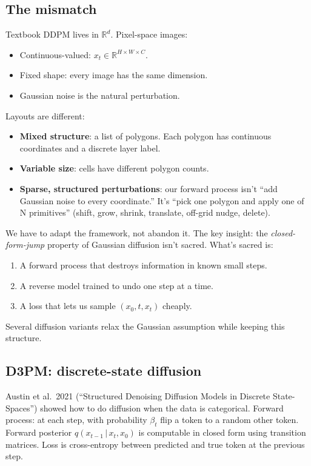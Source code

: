 \documentclass[11pt,a4paper]{article}
\newcommand{\R}{\mathbb{R}}
\newcommand{\given}{\,|\,}
\begin{document}
\subsection{The mismatch}

Textbook DDPM lives in $\R^d$. Pixel-space images:
\begin{itemize}[leftmargin=*]
\item Continuous-valued: $x_t \in \R^{H \times W \times C}$.
\item Fixed shape: every image has the same dimension.
\item Gaussian noise is the natural perturbation.
\end{itemize}

Layouts are different:
\begin{itemize}[leftmargin=*]
\item \textbf{Mixed structure}: a list of polygons. Each polygon has
  continuous coordinates and a discrete layer label.
\item \textbf{Variable size}: cells have different polygon counts.
\item \textbf{Sparse, structured perturbations}: our forward process isn't
  ``add Gaussian noise to every coordinate.'' It's ``pick one polygon
  and apply one of N primitives'' (shift, grow, shrink, translate,
  off-grid nudge, delete).
\end{itemize}

We have to adapt the framework, not abandon it. The key insight: the
\emph{closed-form-jump} property of Gaussian diffusion isn't sacred.
What's sacred is:
\begin{enumerate}[leftmargin=*]
\item A forward process that destroys information in known small steps.
\item A reverse model trained to undo one step at a time.
\item A loss that lets us sample $(x_0, t, x_t)$ cheaply.
\end{enumerate}
Several diffusion variants relax the Gaussian assumption while keeping
this structure.

\subsection{D3PM: discrete-state diffusion}

Austin et al.\ 2021 (``Structured Denoising Diffusion Models in Discrete
State-Spaces'') showed how to do diffusion when the data is categorical.
Forward process: at each step, with probability $\beta_t$ flip a token
to a random other token. Forward posterior $q(x_{t-1}\given x_t, x_0)$
is computable in closed form using transition matrices. Loss is
cross-entropy between predicted and true token at the previous step.
\end{document}
